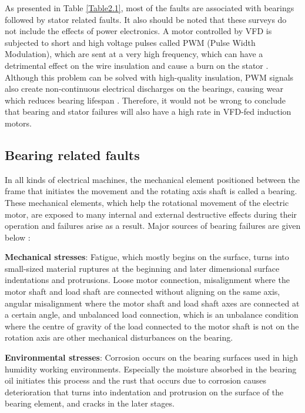 As presented in Table \ref{Table2.1}, most of the faults are associated with bearings followed by stator related faults. It also should be noted that these surveys do not include the effects of power electronics. A motor controlled by VFD is subjected to short and high voltage pulses called PWM (Pulse Width Modulation), which are sent at a very high frequency, which can have a detrimental effect on the wire insulation and cause a burn on the stator \cite{gunnar2016}. Although this problem can be solved with high-quality insulation, PWM signals also create non-continuous electrical discharges on the bearings, causing wear which reduces bearing lifespan \cite{trigeassou2013electrical}. Therefore, it would not be wrong to conclude that bearing and stator failures will also have a high rate in VFD-fed induction motors.

\subsection{Bearing related faults}

In all kinds of electrical machines, the mechanical element positioned between the frame that initiates the movement and the rotating axis shaft is called a bearing. These mechanical elements, which help the rotational movement of the electric motor, are exposed to many internal and external destructive effects during their operation and failures arise as a result. Major sources of bearing failures are given below \cite{zhang2010survey,easa,skf,schoen1995motor,en201320958,bonnet2010}:

\textbf{Mechanical stresses}: Fatigue, which mostly begins on the surface, turns into small-sized material ruptures at the beginning and later dimensional surface indentations and protrusions. Loose motor connection, misalignment where the motor shaft and load shaft are connected without aligning on the same axis, angular misalignment where the motor shaft and load shaft axes are connected at a certain angle, and unbalanced load connection, which is an unbalance condition where the centre of gravity of the load connected to the motor shaft is not on the rotation axis are other mechanical disturbances on the bearing.

\textbf{Environmental stresses}: Corrosion occurs on the bearing surfaces used in high humidity working environments. Especially the moisture absorbed in the bearing oil initiates this process and the rust that occurs due to corrosion causes deterioration that turns into indentation and protrusion on the surface of the bearing element, and cracks in the later stages.

